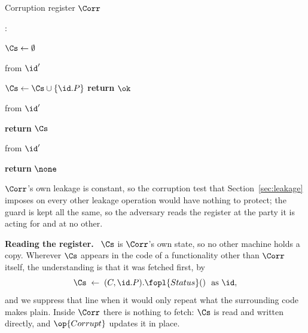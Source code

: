 \documentclass[10pt,oneside,openany]{book}
\newcommand{\heading}[1]{\medskip\par\noindent\textcolor{accent}{\textbf{#1.}}\ }
\theoremstyle{accentdef}
\theoremstyle{accentplain}
\begin{document}
\begin{interface}{Corruption register $\Corr$ \\
}

:
\begin{algorithmic}[1]
\setcounter{contline}{0}\algcont
\State $\Cs \gets \emptyset$
\algsave
\end{algorithmic}
\vspace{1.4ex}
 \quad from $\id'$
\begin{algorithmic}[1]
\algcont
   \label{ln:corronlya}
  \State $\Cs \gets \Cs \cup \{\id.P\}$ \label{ln:corrwrite}
    \State \textbf{return} $\ok$
\algsave
\end{algorithmic}
\vspace{1.4ex}
 \quad from $\id'$
\begin{algorithmic}[1]
\algcont
  \State \textbf{return} $\Cs$
\algsave
\end{algorithmic}
\vspace{1.4ex}

 \quad from $\id'$
\begin{algorithmic}[1]
\algcont
  \State \textbf{return} $\none$
\algsave
\end{algorithmic}
\end{interface}

$\Corr$'s own leakage is constant, so the corruption test that Section~\ref{sec:leakage} imposes
on every other leakage operation would have nothing to protect; the guard is kept all the same, so
the adversary reads the register at the party it is acting for and at no other.

\heading{Reading the register} $\Cs$ is $\Corr$'s own state, so no other machine holds a copy.
Wherever $\Cs$ appears in the code of a functionality other than $\Corr$ itself, the understanding
is that it was fetched first, by
\[
  \Cs \;\gets\; (C,\id.P).\fopl{Status}() \ \text{ as } \id ,
\]
and we suppress that line when it would only repeat what the surrounding code makes plain. Inside
$\Corr$ there is nothing to fetch: $\Cs$ is read and written directly, and $\op{Corrupt}$ updates it
in place.
\end{document}
